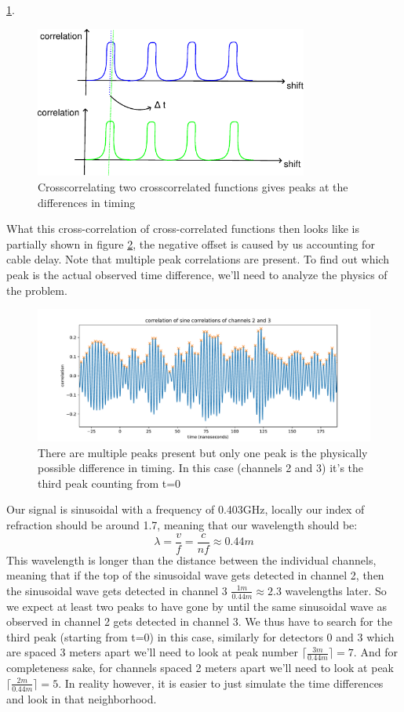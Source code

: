 \ref{fig:IlluCorr}. 
\begin{figure}
  \centering
\includegraphics[width=0.8\textwidth]{figures/IlluCorr.pdf}
\caption{Crosscorrelating two crosscorrelated functions gives peaks at the differences in timing}
	\label{fig:IlluCorr}
\end{figure}
What this cross-correlation of cross-correlated functions then looks like is partially shown
in figure \ref{fig:CrossCrossCorr}, the negative offset is caused by us accounting for cable
delay. Note that multiple peak correlations are present. To find out which peak
is the actual observed time difference, we'll need to analyze the physics of the problem.
\begin{figure}
  \centering
  \includegraphics[width=\textwidth]{figures/CrossCrossCorr.pdf}
  \caption{There are multiple peaks present but only one peak is the physically possible difference in timing. In this case (channels 2 and 3)
  it's the third peak counting from t=0}
	\label{fig:CrossCrossCorr}
\end{figure}
Our signal is sinusoidal with a frequency of 0.403GHz, locally our index of refraction should be around 1.7,
meaning that our wavelength should be:
\begin{equation}
  \lambda = \frac{v}{f} = \frac{c}{nf} \approx 0.44m
\end{equation}
This wavelength is longer than the distance between the individual channels, meaning that if the top
of the sinusoidal wave gets detected in channel 2, then the sinusoidal wave gets detected in
channel 3 $\frac{1m}{0.44m} \approx 2.3$ wavelengths later. So we expect at least two peaks to 
have gone by until the same sinusoidal wave as observed in channel 2 gets detected in channel 3.
We thus have to search for the third peak (starting from t=0) in this case, similarly for detectors 0 and 3
which are spaced 3 meters apart we'll need to look at peak number $\lceil\frac{3m}{0.44m}\rceil = 7$.
And for completeness sake, for channels spaced 2 meters apart we'll need to look at peak 
$\lceil\frac{2m}{0.44m}\rceil = 5$. In reality however, it is easier to just simulate the time differences
and look in that neighborhood.

